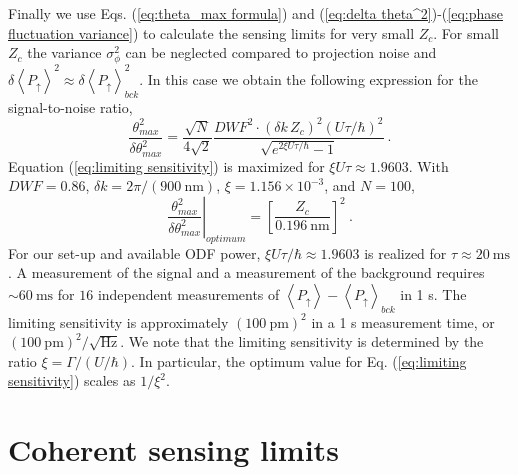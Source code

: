 \documentclass[aps,prl,superscriptaddress,floatfix]{revtex4-1}
\begin{document}
Finally we use Eqs. (\ref{eq:theta_max formula}) and (\ref{eq:delta theta^2})-(\ref{eq:phase fluctuation variance})
to calculate the sensing limits for very small $Z_{c}$. For small
$Z_{c}$ the variance $\sigma_{\phi}^{2}$ can be neglected compared
to projection noise and $\delta\left\langle P_{\uparrow}\right\rangle ^{2}\approx\delta\left\langle P_{\uparrow}\right\rangle _{bck}^{2}$.
In this case we obtain the following expression for the signal-to-noise
ratio,
\begin{equation}
\frac{\theta_{max}^{2}}{\delta\theta_{max}^{2}}=\frac{\sqrt{N}}{4\sqrt{2}}\frac{DWF^{2}\cdot\left(\delta k\,Z_{c}\right)^{2}\left(U\tau/\hbar\right)^{2}}{\sqrt{e^{2\xi U\tau/\hbar}-1}}\:.\label{eq:limiting sensitivity}
\end{equation}
Equation (\ref{eq:limiting sensitivity}) is maximized for $\xi U\tau\approx1.9603$.
With $DWF=0.86$, $\delta k=2\pi/\left(900\:\mathrm{nm}\right)$,
$\xi=1.156\times10^{-3}$, and $N=100$,
\begin{equation}
\left.\frac{\theta_{max}^{2}}{\delta\theta_{max}^{2}}\right|_{optimum}=\left[\frac{Z_{c}}{0.196\:\mathrm{nm}}\right]^{2}\:.\label{eq:26.1 Z_c^2}
\end{equation}
For our set-up and available ODF power, $\xi U\tau/\hbar\approx1.9603$
is realized for $\tau\approx20\:\mathrm{ms}$. A measurement of the
signal and a measurement of the background requires $\sim60\:\mathrm{ms}$
for $16$ independent measurements of $\left\langle P_{\uparrow}\right\rangle -\left\langle P_{\uparrow}\right\rangle _{bck}$
in 1 s. The limiting sensitivity is approximately $\left(100\:\mathrm{pm}\right)^{2}$
in a 1 s measurement time, or $\left(100\:\mathrm{pm}\right)^{2}/\sqrt{\mathrm{Hz}}$.
We note that the limiting sensitivity is determined by the ratio $\xi=\Gamma/\left(U/\hbar\right)$.
In particular, the optimum value for Eq. (\ref{eq:limiting sensitivity})
scales as $1/\xi^{2}$.

\part*{Coherent sensing limits}
\end{document}
